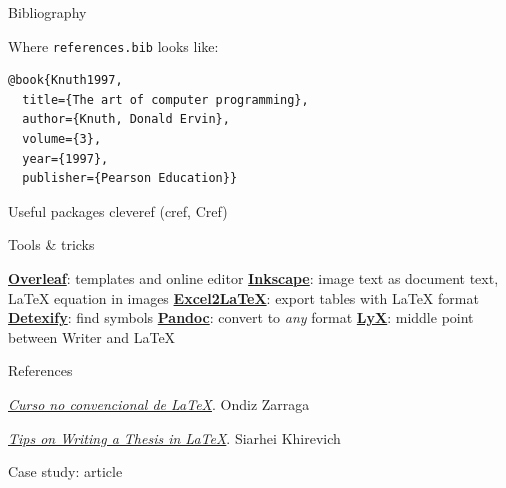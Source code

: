 \begin{frame}[fragile]{Bibliography}

Where \texttt{references.bib} looks like:

\begin{lstlisting}[breaklines=false]
@book{Knuth1997,
  title={The art of computer programming},
  author={Knuth, Donald Ervin},
  volume={3},
  year={1997},
  publisher={Pearson Education}}
\end{lstlisting}
\end{frame}

\begin{frame}{Useful packages}
cleveref (cref, Cref)
\end{frame}

\begin{frame}{Tools \& tricks}
 \begin{fullpageitemize}
  \itemR \href{https://www.overleaf.com/}{\textbf{Overleaf}}: templates and online editor
  \itemR \href{http://wiki.inkscape.org/wiki/index.php/LaTeX}{\textbf{Inkscape}}: image text as document text, LaTeX equation in images
  \itemR \href{https://www.ctan.org/tex-archive/support/excel2latex/}{\textbf{Excel2LaTeX}}: export tables with LaTeX format
  \itemR \href{http://detexify.kirelabs.org/classify.html}{\textbf{Detexify}}: find symbols
  \itemR \href{http://pandoc.org/}{\textbf{Pandoc}}: convert to \emph{any} format
  \itemR \href{https://www.lyx.org/}{\textbf{LyX}}: middle point between Writer and LaTeX
\end{fullpageitemize}
 
\end{frame}

\begin{frame}{References}
 \begin{fullpageitemize}
	\itemR\href{https://ondiz.github.io/cursoLatex/}{\emph{Curso no convencional de LaTeX}}. Ondiz Zarraga

	\itemR \href{http://www.khirevich.com/latex/}{\emph{Tips on Writing a Thesis in LaTeX}}. Siarhei Khirevich
 \end{fullpageitemize}
 
\end{frame}

\begin{frame}{Case study: article}
 
 \begin{fullpageitemize}
	\itemR
 \end{fullpageitemize} 
 
 \note{}
\end{frame}

